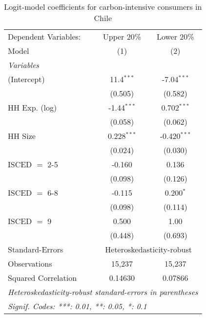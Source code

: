
\begin{table}[htbp!]
   \centering
   \small
   \begin{adjustbox}{width = 1\textwidth, max height = 0.95\textheight, center}
      \begin{threeparttable}[b]
         \caption{\label{tab:Logit_1_CHL} Logit-model coefficients for carbon-intensive consumers in Chile}
         \begin{tabular}{lcc}
            \tabularnewline \midrule \midrule
            Dependent Variables: & Upper 20\%    & Lower 20\%\\   
            Model                & (1)           & (2)\\  
            \midrule
            \emph{Variables}\\
            (Intercept)          & 11.4$^{***}$  & -7.04$^{***}$\\   
                                 & (0.505)       & (0.582)\\   
            HH Exp. (log)        & -1.44$^{***}$ & 0.702$^{***}$\\   
                                 & (0.058)       & (0.062)\\   
            HH Size              & 0.228$^{***}$ & -0.420$^{***}$\\   
                                 & (0.024)       & (0.030)\\   
            ISCED $=$ 2-5        & -0.160        & 0.136\\   
                                 & (0.098)       & (0.126)\\   
            ISCED $=$ 6-8        & -0.115        & 0.200$^{*}$\\   
                                 & (0.098)       & (0.114)\\   
            ISCED $=$ 9          & 0.500         & 1.00\\   
                                 & (0.448)       & (0.693)\\   
            \midrule 
            Standard-Errors & \multicolumn{2}{c}{Heteroskedasticity-robust} \\ 
            Observations         & 15,237        & 15,237\\  
            Squared Correlation  & 0.14630       & 0.07866\\  
            \midrule \midrule
            \multicolumn{3}{l}{\emph{Heteroskedasticity-robust standard-errors in parentheses}}\\
            \multicolumn{3}{l}{\emph{Signif. Codes: ***: 0.01, **: 0.05, *: 0.1}}\\
         \end{tabular}
         

\end{threeparttable}
\end{adjustbox}
\end{table}
